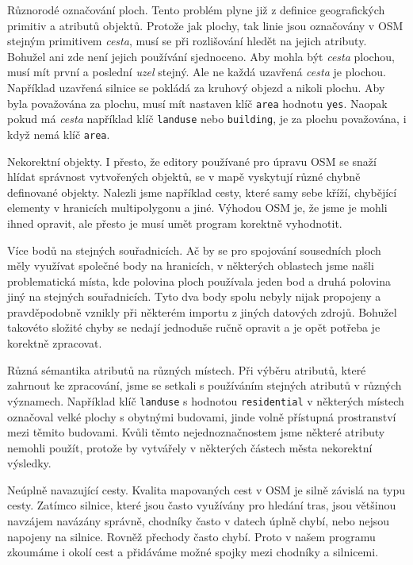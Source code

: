 {\tuc Různorodé označování ploch.} Tento problém plyne již z definice geografických
primitiv a atributů objektů. Protože jak plochy, tak linie jsou označovány v OSM
stejným primitivem {\em cesta}, musí se při rozlišování hledět na jejich atributy.
Bohužel ani zde není jejich používání sjednoceno. Aby mohla být {\em cesta}
plochou, musí mít první a poslední {\em uzel} stejný. Ale ne každá uzavřená {\em
cesta } je plochou. Například uzavřená silnice se pokládá za kruhový objezd a
nikoli plochu. Aby byla považována za plochu, musí mít nastaven klíč
\verb|area| hodnotu \verb|yes|. Naopak pokud má {\em cesta} například klíč \verb|landuse|
nebo \verb|building|, je za plochu považována, i když nemá klíč \verb|area|.

{\tuc Nekorektní objekty.} I přesto, že editory používané pro úpravu OSM se snaží
hlídat správnost vytvořených objektů, se v mapě vyskytují různé chybně
definované objekty. Nalezli jsme například cesty, které samy sebe kříží,
chybějící elementy v hranicích multipolygonu a jiné. Výhodou OSM je, že jsme je
mohli ihned opravit, ale přesto je musí umět program korektně vyhodnotit.

{\tuc Více bodů na stejných souřadnicích.} Ač by se pro spojování sousedních ploch měly
využívat společné body na hranicích, v některých oblastech jsme našli
problematická místa, kde polovina ploch používala jeden bod a druhá polovina
jiný na stejných souřadnicích. Tyto dva body spolu nebyly nijak propojeny a
pravděpodobně vznikly při některém importu z jiných datových zdrojů. Bohužel
takovéto složité chyby se nedají jednoduše ručně opravit a je opět potřeba je
korektně zpracovat.

{\tuc Různá sémantika atributů na různých místech.} Při výběru atributů, které zahrnout
ke zpracování, jsme se setkali s používáním stejných atributů v různých
významech. Například klíč \verb|landuse| s hodnotou \verb|residential| v
některých místech označoval velké plochy s obytnými budovami, jinde volně
přístupná prostranství mezi těmito budovami. Kvůli těmto nejednoznačnostem jsme
některé atributy nemohli použít, protože by vytvářely v některých částech města
nekorektní výsledky.

{\tuc Neúplně navazující cesty.} Kvalita mapovaných cest v OSM je silně závislá na typu
cesty. Zatímco silnice, které jsou často využívány pro hledání tras, jsou
většinou navzájem navázány správně, chodníky často v datech úplně chybí, nebo
nejsou napojeny na silnice. Rovněž přechody často chybí. Proto v našem programu
zkoumáme i okolí cest a přidáváme možné spojky mezi chodníky a silnicemi.

